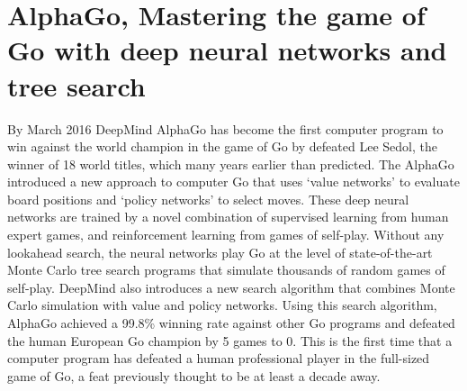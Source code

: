 \documentclass[12pt,a4paper]{report}
\begin{document}
\section{AlphaGo, Mastering the game of Go with deep neural networks and tree search}
{
\hspace{0.6cm} By March 2016 DeepMind AlphaGo has become the first computer program to win against the world champion in the game of Go by defeated Lee Sedol, the winner of 18 world titles, which many years earlier than predicted\cite{GovsCom}\cite{AGWeb}. The AlphaGo introduced a new approach to computer Go that uses ‘value networks’ to evaluate board positions and ‘policy networks’ to select moves. These deep neural networks are trained by a novel combination of supervised learning from human expert games, and reinforcement learning from games of self-play. Without any lookahead search, the neural networks play Go at the level of state-of-the-art Monte Carlo tree search programs that simulate thousands of random games of self-play. DeepMind also introduces a new search algorithm that combines Monte Carlo simulation with value and policy networks. Using this search algorithm, AlphaGo achieved a 99.8\% winning rate against other Go programs and defeated the human European Go champion by 5 games to 0. This is the first time that a computer program has defeated a human professional player in the full-sized game of Go, a feat previously thought to be at least a decade away\cite{AlphaGo}.\par
}
\end{document}
